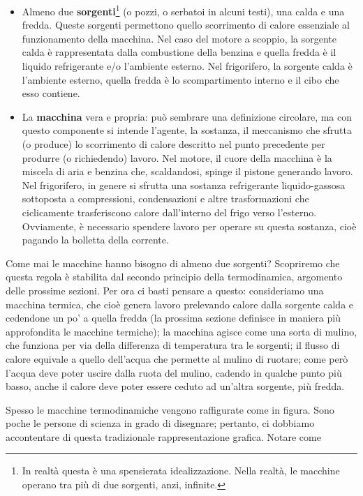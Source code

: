 \begin{itemize}
    \item Almeno due \textbf{sorgenti}\footnote{In realtà questa è una
    spensierata idealizzazione. Nella realtà, le macchine
    operano tra più di due sorgenti, anzi, infinite.} (o pozzi, o serbatoi in alcuni
    testi), una calda e una fredda. Queste sorgenti
    permettono quello scorrimento di calore essenziale al
    funzionamento della macchina. Nel caso
    del motore a scoppio, la sorgente calda è rappresentata dalla
    combustione della benzina e quella fredda è il
    liquido refrigerante e/o l'ambiente esterno. Nel
    frigorifero, la sorgente calda è l'ambiente esterno,
    quella fredda è lo scompartimento interno e il
    cibo che esso contiene.

    \item La \textbf{macchina} vera e propria: può sembrare
    una definizione circolare, ma con questo componente
    si intende l'agente, la sostanza, il meccanismo
    che sfrutta (o produce) lo scorrimento di
    calore descritto nel punto precedente per
    produrre (o richiedendo) lavoro. Nel motore,
    il cuore della macchina è la miscela di aria
    e benzina che, scaldandosi, spinge il pistone
    generando lavoro. Nel frigorifero, in genere si
    sfrutta una sostanza refrigerante liquido-gassosa
    sottoposta a compressioni, condensazioni e altre
    trasformazioni che ciclicamente trasferiscono
    calore dall'interno del frigo verso l'esterno.
    Ovviamente, è necessario spendere lavoro per
    operare su questa sostanza, cioè pagando la
    bolletta della corrente.
\end{itemize}

Come mai le macchine hanno bisogno di almeno due sorgenti?
Scopriremo che questa regola è stabilita dal secondo principio
della termodinamica, argomento delle prossime sezioni.
Per ora ci basti pensare a questo:
consideriamo una macchina termica, che cioè genera lavoro
prelevando calore dalla sorgente calda e cedendone un po' a
quella fredda (la prossima sezione definisce in maniera più
approfondita le macchine termiche); la macchina agisce come
una sorta di mulino, che funziona per via della differenza
di temperatura tra le sorgenti; il flusso di calore equivale
a quello dell'acqua che permette al mulino di ruotare; come
però l'acqua deve poter uscire dalla ruota del mulino, cadendo
in qualche punto più basso, anche
il calore deve poter essere ceduto ad un'altra sorgente, più
fredda.

Spesso le macchine termodinamiche vengono raffigurate
come in figura.
Sono poche le persone di scienza in grado di disegnare;
pertanto, ci dobbiamo accontentare di questa tradizionale
rappresentazione grafica. Notare come

